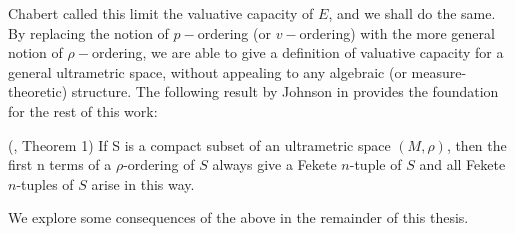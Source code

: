 Chabert called this limit the valuative capacity of $E$, and we shall do the same. By replacing the notion of $p-$ordering (or $v-$ordering) with the more general notion of $\rho-$ordering, we are able to give a definition of valuative capacity for a general ultrametric space, without appealing to any algebraic (or measure-theoretic) structure. The following result by Johnson in \cite{kj} provides the foundation for the rest of this work:

\begin{proposition} (\cite{kj}, Theorem 1)
If S is a compact subset of an ultrametric space $(M, \rho)$, then the first n terms of a $\rho$-ordering of $S$ always give a Fekete $n$-tuple of $S$ and all Fekete
$n$-tuples of $S$ arise in this way.
\end{proposition}

We explore some consequences of the above in the remainder of this thesis. 